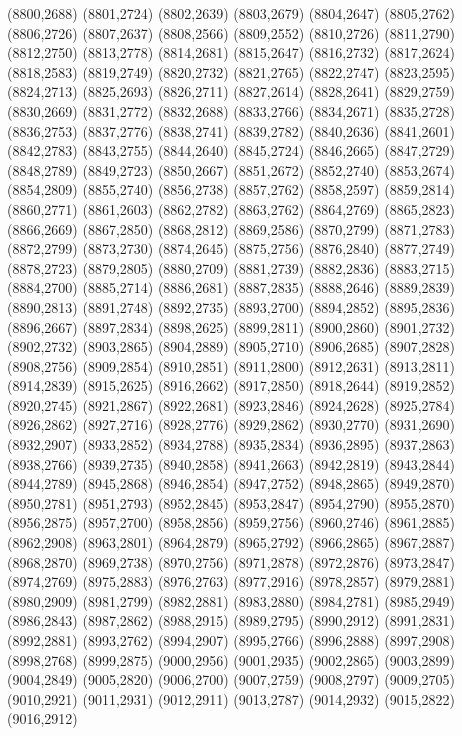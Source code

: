 (8800,2688)
(8801,2724)
(8802,2639)
(8803,2679)
(8804,2647)
(8805,2762)
(8806,2726)
(8807,2637)
(8808,2566)
(8809,2552)
(8810,2726)
(8811,2790)
(8812,2750)
(8813,2778)
(8814,2681)
(8815,2647)
(8816,2732)
(8817,2624)
(8818,2583)
(8819,2749)
(8820,2732)
(8821,2765)
(8822,2747)
(8823,2595)
(8824,2713)
(8825,2693)
(8826,2711)
(8827,2614)
(8828,2641)
(8829,2759)
(8830,2669)
(8831,2772)
(8832,2688)
(8833,2766)
(8834,2671)
(8835,2728)
(8836,2753)
(8837,2776)
(8838,2741)
(8839,2782)
(8840,2636)
(8841,2601)
(8842,2783)
(8843,2755)
(8844,2640)
(8845,2724)
(8846,2665)
(8847,2729)
(8848,2789)
(8849,2723)
(8850,2667)
(8851,2672)
(8852,2740)
(8853,2674)
(8854,2809)
(8855,2740)
(8856,2738)
(8857,2762)
(8858,2597)
(8859,2814)
(8860,2771)
(8861,2603)
(8862,2782)
(8863,2762)
(8864,2769)
(8865,2823)
(8866,2669)
(8867,2850)
(8868,2812)
(8869,2586)
(8870,2799)
(8871,2783)
(8872,2799)
(8873,2730)
(8874,2645)
(8875,2756)
(8876,2840)
(8877,2749)
(8878,2723)
(8879,2805)
(8880,2709)
(8881,2739)
(8882,2836)
(8883,2715)
(8884,2700)
(8885,2714)
(8886,2681)
(8887,2835)
(8888,2646)
(8889,2839)
(8890,2813)
(8891,2748)
(8892,2735)
(8893,2700)
(8894,2852)
(8895,2836)
(8896,2667)
(8897,2834)
(8898,2625)
(8899,2811)
(8900,2860)
(8901,2732)
(8902,2732)
(8903,2865)
(8904,2889)
(8905,2710)
(8906,2685)
(8907,2828)
(8908,2756)
(8909,2854)
(8910,2851)
(8911,2800)
(8912,2631)
(8913,2811)
(8914,2839)
(8915,2625)
(8916,2662)
(8917,2850)
(8918,2644)
(8919,2852)
(8920,2745)
(8921,2867)
(8922,2681)
(8923,2846)
(8924,2628)
(8925,2784)
(8926,2862)
(8927,2716)
(8928,2776)
(8929,2862)
(8930,2770)
(8931,2690)
(8932,2907)
(8933,2852)
(8934,2788)
(8935,2834)
(8936,2895)
(8937,2863)
(8938,2766)
(8939,2735)
(8940,2858)
(8941,2663)
(8942,2819)
(8943,2844)
(8944,2789)
(8945,2868)
(8946,2854)
(8947,2752)
(8948,2865)
(8949,2870)
(8950,2781)
(8951,2793)
(8952,2845)
(8953,2847)
(8954,2790)
(8955,2870)
(8956,2875)
(8957,2700)
(8958,2856)
(8959,2756)
(8960,2746)
(8961,2885)
(8962,2908)
(8963,2801)
(8964,2879)
(8965,2792)
(8966,2865)
(8967,2887)
(8968,2870)
(8969,2738)
(8970,2756)
(8971,2878)
(8972,2876)
(8973,2847)
(8974,2769)
(8975,2883)
(8976,2763)
(8977,2916)
(8978,2857)
(8979,2881)
(8980,2909)
(8981,2799)
(8982,2881)
(8983,2880)
(8984,2781)
(8985,2949)
(8986,2843)
(8987,2862)
(8988,2915)
(8989,2795)
(8990,2912)
(8991,2831)
(8992,2881)
(8993,2762)
(8994,2907)
(8995,2766)
(8996,2888)
(8997,2908)
(8998,2768)
(8999,2875)
(9000,2956)
(9001,2935)
(9002,2865)
(9003,2899)
(9004,2849)
(9005,2820)
(9006,2700)
(9007,2759)
(9008,2797)
(9009,2705)
(9010,2921)
(9011,2931)
(9012,2911)
(9013,2787)
(9014,2932)
(9015,2822)
(9016,2912)
